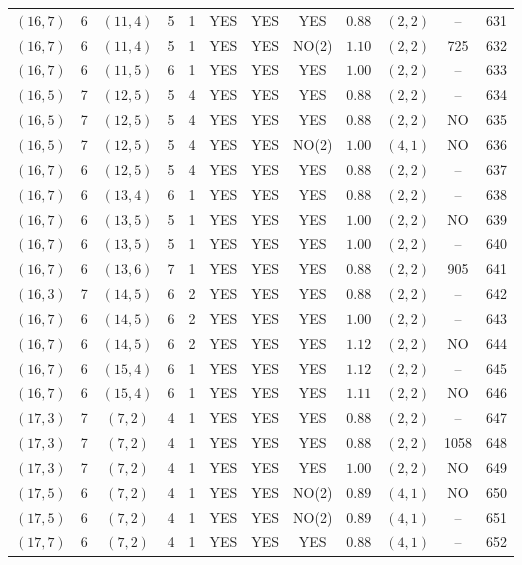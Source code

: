 \begin{longtable}{|c|c|c|c|c|c|c|c|c|c|c|c|}
$(16,7)$ & 6 & $(11,4)$ & 5 & 1 & YES & YES & YES & $0.88$ & $(2,2)$ & -- & 631\\
$(16,7)$ & 6 & $(11,4)$ & 5 & 1 & YES & YES & NO(2) & $1.10$ & $(2,2)$ & 725 & 632\\
$(16,7)$ & 6 & $(11,5)$ & 6 & 1 & YES & YES & YES & $1.00$ & $(2,2)$ & -- & 633\\
$(16,5)$ & 7 & $(12,5)$ & 5 & 4 & YES & YES & YES & $0.88$ & $(2,2)$ & -- & 634\\
$(16,5)$ & 7 & $(12,5)$ & 5 & 4 & YES & YES & YES & $0.88$ & $(2,2)$ & NO & 635\\
$(16,5)$ & 7 & $(12,5)$ & 5 & 4 & YES & YES & NO(2) & $1.00$ & $(4,1)$ & NO & 636\\
$(16,7)$ & 6 & $(12,5)$ & 5 & 4 & YES & YES & YES & $0.88$ & $(2,2)$ & -- & 637\\
$(16,7)$ & 6 & $(13,4)$ & 6 & 1 & YES & YES & YES & $0.88$ & $(2,2)$ & -- & 638\\
$(16,7)$ & 6 & $(13,5)$ & 5 & 1 & YES & YES & YES & $1.00$ & $(2,2)$ & NO & 639\\
$(16,7)$ & 6 & $(13,5)$ & 5 & 1 & YES & YES & YES & $1.00$ & $(2,2)$ & -- & 640\\
$(16,7)$ & 6 & $(13,6)$ & 7 & 1 & YES & YES & YES & $0.88$ & $(2,2)$ & 905 & 641\\
$(16,3)$ & 7 & $(14,5)$ & 6 & 2 & YES & YES & YES & $0.88$ & $(2,2)$ & -- & 642\\
$(16,7)$ & 6 & $(14,5)$ & 6 & 2 & YES & YES & YES & $1.00$ & $(2,2)$ & -- & 643\\
$(16,7)$ & 6 & $(14,5)$ & 6 & 2 & YES & YES & YES & $1.12$ & $(2,2)$ & NO & 644\\
$(16,7)$ & 6 & $(15,4)$ & 6 & 1 & YES & YES & YES & $1.12$ & $(2,2)$ & -- & 645\\
$(16,7)$ & 6 & $(15,4)$ & 6 & 1 & YES & YES & YES & $1.11$ & $(2,2)$ & NO & 646\\
$(17,3)$ & 7 & $(7,2)$ & 4 & 1 & YES & YES & YES & $0.88$ & $(2,2)$ & -- & 647\\
$(17,3)$ & 7 & $(7,2)$ & 4 & 1 & YES & YES & YES & $0.88$ & $(2,2)$ & 1058 & 648\\
$(17,3)$ & 7 & $(7,2)$ & 4 & 1 & YES & YES & YES & $1.00$ & $(2,2)$ & NO & 649\\
$(17,5)$ & 6 & $(7,2)$ & 4 & 1 & YES & YES & NO(2) & $0.89$ & $(4,1)$ & NO & 650\\
$(17,5)$ & 6 & $(7,2)$ & 4 & 1 & YES & YES & NO(2) & $0.89$ & $(4,1)$ & -- & 651\\
$(17,7)$ & 6 & $(7,2)$ & 4 & 1 & YES & YES & YES & $0.88$ & $(4,1)$ & -- & 652\\

\end{longtable}
